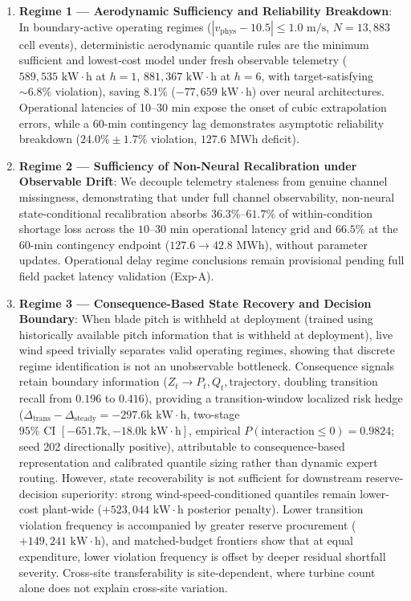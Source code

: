 \documentclass[
  journal]{IEEEtran}
\providecommand{\tightlist}{%
  \setlength{\itemsep}{0pt}\setlength{\parskip}{0pt}}
\begin{document}
\begin{enumerate}
\def\labelenumi{\arabic{enumi}.}
\tightlist
\item
  \textbf{Regime 1 --- Aerodynamic Sufficiency and Reliability
  Breakdown}: In boundary-active operating regimes
  (\(|v_{\text{phys}}-10.5|\le 1.0\text{ m/s}\), \(N=13{,}883\) cell
  events), deterministic aerodynamic quantile rules are the minimum
  sufficient and lowest-cost model under fresh observable telemetry
  (\(589{,}535\text{ kW}\cdot\text{h}\) at \(h=1\),
  \(881{,}367\text{ kW}\cdot\text{h}\) at \(h=6\), with
  target-satisfying \(\sim 6.8\%\) violation), saving \(8.1\%\)
  (\(-77{,}659\text{ kW}\cdot\text{h}\)) over neural architectures.
  Operational latencies of 10--30 min expose the onset of cubic
  extrapolation errors, while a 60-min contingency lag demonstrates
  asymptotic reliability breakdown (\(24.0\% \pm 1.7\%\) violation,
  \(127.6\text{ MWh}\) deficit).
\item
  \textbf{Regime 2 --- Sufficiency of Non-Neural Recalibration under
  Observable Drift}: We decouple telemetry staleness from genuine
  channel missingness, demonstrating that under full channel
  observability, non-neural state-conditional recalibration absorbs
  \(36.3\%\)--\(61.7\%\) of within-condition shortage loss across the
  \(10\)--\(30\) min operational latency grid and \(66.5\%\) at the
  \(60\)-min contingency endpoint (\(127.6 \to 42.8\text{ MWh}\)),
  without parameter updates. Operational delay regime conclusions remain
  provisional pending full field packet latency validation (Exp-A).
\item
  \textbf{Regime 3 --- Consequence-Based State Recovery and Decision
  Boundary}: When blade pitch is withheld at deployment (trained using
  historically available pitch information that is withheld at
  deployment), live wind speed trivially separates valid operating
  regimes, showing that discrete regime identification is not an
  unobservable bottleneck. Consequence signals retain boundary
  information (\(Z_t \to P_t, Q_t, \text{trajectory}\), doubling
  transition recall from \(0.196\) to \(0.416\)), providing a
  transition-window localized risk hedge
  (\(\Delta_{\text{trans}} - \Delta_{\text{steady}} = -297.6\text{k}\text{ kW}\cdot\text{h}\),
  two-stage
  \(95\%\text{ CI } [-651.7\text{k}, -18.0\text{k}\text{ kW}\cdot\text{h}]\),
  empirical \(P(\text{interaction} \le 0) = 0.9824\); seed 202
  directionally positive), attributable to consequence-based
  representation and calibrated quantile sizing rather than dynamic
  expert routing. However, state recoverability is not sufficient for
  downstream reserve-decision superiority: strong wind-speed-conditioned
  quantiles remain lower-cost plant-wide
  (\(+523{,}044\text{ kW}\cdot\text{h}\) posterior penalty). Lower
  transition violation frequency is accompanied by greater reserve
  procurement (\(+149{,}241\text{ kW}\cdot\text{h}\)), and
  matched-budget frontiers show that at equal expenditure, lower
  violation frequency is offset by deeper residual shortfall severity.
  Cross-site transferability is site-dependent, where turbine count
  alone does not explain cross-site variation.
\end{enumerate}
\end{document}
